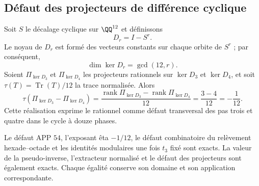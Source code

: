 \subsection{Défaut des projecteurs de différence cyclique}

Soit \(S\) le décalage cyclique sur \(\QQ^{12}\) et définissons
\[
 D_r=I-S^r.
\]
Le noyau de \(D_r\) est formé des vecteurs constants sur chaque orbite
de \(S^r\) ; par conséquent,
\[
 \dim\ker D_r=\gcd(12,r).
\]
Soient \(\Pi_{\ker D_3}\) et \(\Pi_{\ker D_4}\) les projecteurs rationnels sur
\(\ker D_3\) et \(\ker D_4\), et soit
\(\tau(T)=\operatorname{Tr}(T)/12\) la trace normalisée. Alors
\[
 \boxed{
 \tau(\Pi_{\ker D_3}-\Pi_{\ker D_4})
 =\frac{\operatorname{rank}\Pi_{\ker D_3}
       -\operatorname{rank}\Pi_{\ker D_4}}{12}
 =\frac{3-4}{12}
 =-\frac1{12}.}
\]
Cette réalisation exprime le rationnel comme défaut transversal des pas
trois et quatre dans le cycle à douze phases.

\begin{remark}
Le défaut APP \(54\), l’exposant êta \(-1/12\), le défaut
combinatoire du relèvement hexade--octade et les
identités modulaires une fois \(t_3\) fixé sont exacts. La valeur
de la pseudo-inverse, l’extracteur normalisé et le défaut des projecteurs sont également exacts.
Chaque égalité conserve son domaine et son application correspondante.
\end{remark}
